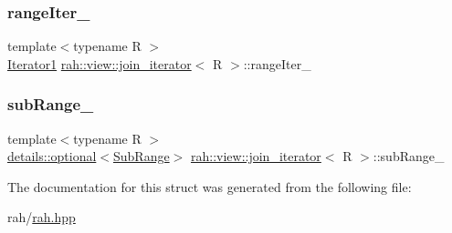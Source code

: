 \mbox{\label{structrah_1_1view_1_1join__iterator_a754b7bdee5ca2b23868a402c2c3cfcc2}} 
\subsubsection{\texorpdfstring{rangeIter\_}{rangeIter\_}}
{\footnotesize\ttfamily template$<$typename R $>$ \\
\mbox{\hyperlink{structrah_1_1view_1_1join__iterator_a8b71c6f25eee2915e2a8afc6e024196d}{Iterator1}} \mbox{\hyperlink{structrah_1_1view_1_1join__iterator}{rah\+::view\+::join\+\_\+iterator}}$<$ R $>$\+::range\+Iter\+\_\+}

\mbox{\label{structrah_1_1view_1_1join__iterator_ae9351284af0f64c368606315da0b56a5}} 
\subsubsection{\texorpdfstring{subRange\_}{subRange\_}}
{\footnotesize\ttfamily template$<$typename R $>$ \\
\mbox{\hyperlink{structrah_1_1view_1_1details_1_1optional}{details\+::optional}}$<$\mbox{\hyperlink{structrah_1_1view_1_1join__iterator_1_1_sub_range}{Sub\+Range}}$>$ \mbox{\hyperlink{structrah_1_1view_1_1join__iterator}{rah\+::view\+::join\+\_\+iterator}}$<$ R $>$\+::sub\+Range\+\_\+}



The documentation for this struct was generated from the following file\+:\begin{DoxyCompactItemize}
\item 
rah/\mbox{\hyperlink{rah_8hpp}{rah.\+hpp}}\end{DoxyCompactItemize}
